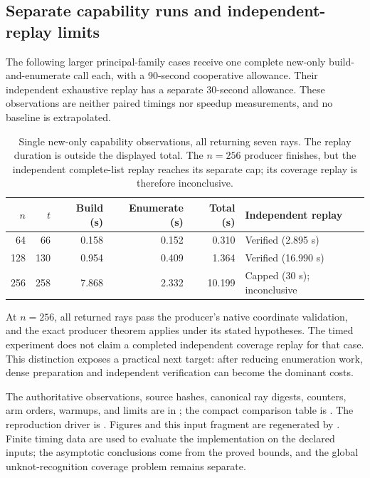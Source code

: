 \subsection{Separate capability runs and independent-replay limits}

The following larger principal-family cases receive one complete
new-only build-and-enumerate call each, with a 90-second cooperative
allowance. Their independent exhaustive replay has a separate
30-second allowance. These observations are neither paired timings
nor speedup measurements, and no baseline is extrapolated.

\begin{table}[htbp]
\centering\small
\begin{tabular*}{\linewidth}{@{\extracolsep{\fill}}rrrrrl@{}}
\toprule
$n$ & $t$ & Build (s) & Enumerate (s) & Total (s) & Independent replay\\
\midrule
64 & 66 & 0.158 & 0.152 & 0.310 & Verified (2.895 s)\\
128 & 130 & 0.954 & 0.409 & 1.364 & Verified (16.990 s)\\
256 & 258 & 7.868 & 2.332 & 10.199 & Capped (30 s); inconclusive\\
\bottomrule
\end{tabular*}
\caption{Single new-only capability observations, all returning seven
rays. The replay duration is outside the displayed total. The $n=256$
producer finishes, but the independent complete-list replay reaches its
separate cap; its coverage replay is therefore inconclusive.}
\label{tab:capacity}
\end{table}

At $n=256$, all returned rays pass the producer's native coordinate
validation, and the exact producer theorem applies under its stated
hypotheses. The timed experiment does not claim a completed independent
coverage replay for that case. This distinction exposes a practical
next target: after reducing enumeration work, dense preparation and
independent verification can become the dominant costs.

The authoritative observations, source hashes, canonical ray digests,
counters, arm orders, warmups, and limits are in
; the compact comparison table is
. The reproduction driver is
. Figures and this input fragment are
regenerated by . Finite timing
data are used to evaluate the implementation on the declared inputs;
the asymptotic conclusions come from the proved bounds, and the global
unknot-recognition coverage problem remains separate.

